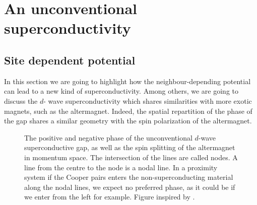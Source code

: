 \documentclass[../main.tex]{subfile}
\begin{document}
\section{An unconventional superconductivity}
\subsection{Site dependent potential}
In this section we are going to highlight how the neighbour-depending potential can lead to a new kind of superconductivity. Among others, we are going to discuss the $d$-
wave superconductivity which shares similarities with more exotic magnets, such as the altermagnet. 
Indeed, the spatial repartition of the phase of the gap shares a similar geometry with the spin polarization of the altermagnet.
\begin{figure}[H]
    \centering
    \caption{The positive and negative phase of the unconventional $d$-wave superconductive gap, as well as the spin splitting of the altermagnet in momentum space.
    The intersection of the lines are called nodes. A line from the centre to the node is a nodal line. 
    In a proximity system if the Cooper pairs enters the non-superconducting material 
    along the nodal lines, we expect no preferred phase, as it could be if we enter from the left for example. Figure inspired by \cite{Smejkal2022}.}
\end{figure}
\end{document}
